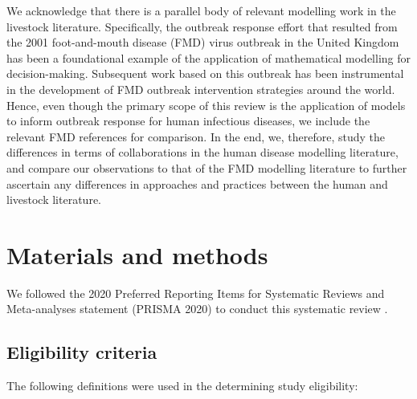 \documentclass[10pt,letterpaper]{article}
\begin{document}
We acknowledge that there is a parallel body of relevant modelling work in the livestock literature. Specifically, the outbreak response effort that resulted from the 2001 foot-and-mouth disease (FMD) virus outbreak in the United Kingdom has been a foundational example of the application of mathematical modelling for decision-making. Subsequent work based on this outbreak has been instrumental in the development of FMD outbreak intervention strategies around the world. Hence, even though the primary scope of this review is the application of models to inform outbreak response for human infectious diseases, we include the relevant FMD references for comparison. In the end, we, therefore, study the differences in terms of collaborations in the human disease modelling literature, and compare our observations to that of the FMD modelling literature to further ascertain any differences in approaches and practices between the human and livestock literature. 




\section*{Materials and methods}
We followed the 2020 Preferred Reporting Items for Systematic Reviews and Meta-analyses statement (PRISMA 2020)  to conduct this systematic review \cite{Page2021}.

\subsection*{Eligibility criteria}
The following definitions were used in the determining study eligibility:
\end{document}
